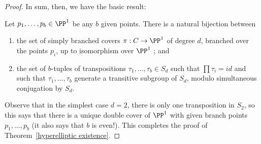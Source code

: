 \begin{proof}
%   
%   
   
   In sum, then, we have the basic result:
   
   \begin{lemma}
   Let $p_1,\dots, p_b \in \PP^1$ be any $b$ given points. There is a natural bijection between 
   \begin{enumerate}
   \item the set of  simply branched covers $\pi : C \to \PP^1$ of degree $d$, branched over the points $p_i$, up to isomorphism over $\PP^1$ 
   ; and 
   \item the set of $b$-tuples of transpositions $\tau_1, \dots, \tau_b \in S_d$ such that $\prod \tau_i = id$ and such that $\tau_1, \dots, \tau_b$ generate a transitive subgroup of $S_d$, modulo simultaneous conjugation by $S_d$.
   \end{enumerate}
   \end{lemma}

Observe that in the simplest case $d=2$, there is only one transposition in $S_2$, so this says that there is a unique double cover of $\PP^1$ with given branch points $p_1,\dots,p_b$ (it also says that $b$ is even!). This completes the proof of Theorem~\ref{hyperelliptic existence}.

\end{proof}


